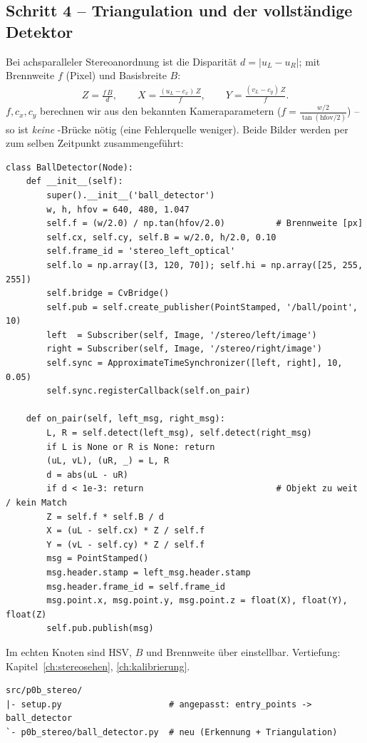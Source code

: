 \subsection{Schritt 4 -- Triangulation und der vollständige Detektor}
Bei achsparalleler Stereoanordnung ist die Disparität $d=|u_L-u_R|$; mit
Brennweite $f$ (Pixel) und Basisbreite $B$:
\begin{align*}
Z=\frac{f\,B}{d},\qquad X=\frac{(u_L-c_x)\,Z}{f},\qquad Y=\frac{(v_L-c_y)\,Z}{f}.
\end{align*}
$f,c_x,c_y$ berechnen wir aus den bekannten Kameraparametern
($f=\tfrac{w/2}{\tan(\text{hfov}/2)}$) -- so ist \emph{keine}
-Brücke nötig (eine Fehlerquelle weniger). Beide Bilder werden
per  zum selben Zeitpunkt zusammengeführt:
\begin{lstlisting}[style=py,caption={\code{p0b\_stereo/ball\_detector.py} (Kern)}]
class BallDetector(Node):
    def __init__(self):
        super().__init__('ball_detector')
        w, h, hfov = 640, 480, 1.047
        self.f = (w/2.0) / np.tan(hfov/2.0)          # Brennweite [px]
        self.cx, self.cy, self.B = w/2.0, h/2.0, 0.10
        self.frame_id = 'stereo_left_optical'
        self.lo = np.array([3, 120, 70]); self.hi = np.array([25, 255, 255])
        self.bridge = CvBridge()
        self.pub = self.create_publisher(PointStamped, '/ball/point', 10)
        left  = Subscriber(self, Image, '/stereo/left/image')
        right = Subscriber(self, Image, '/stereo/right/image')
        self.sync = ApproximateTimeSynchronizer([left, right], 10, 0.05)
        self.sync.registerCallback(self.on_pair)

    def on_pair(self, left_msg, right_msg):
        L, R = self.detect(left_msg), self.detect(right_msg)
        if L is None or R is None: return
        (uL, vL), (uR, _) = L, R
        d = abs(uL - uR)
        if d < 1e-3: return                          # Objekt zu weit / kein Match
        Z = self.f * self.B / d
        X = (uL - self.cx) * Z / self.f
        Y = (vL - self.cy) * Z / self.f
        msg = PointStamped()
        msg.header.stamp = left_msg.header.stamp
        msg.header.frame_id = self.frame_id
        msg.point.x, msg.point.y, msg.point.z = float(X), float(Y), float(Z)
        self.pub.publish(msg)
\end{lstlisting}
\noindent Im echten Knoten sind HSV, $B$ und Brennweite über
 einstellbar. Vertiefung: Kapitel~\ref{ch:stereosehen},
\ref{ch:kalibrierung}.
\begin{lstlisting}[style=bash,caption={\code{ros2\_ws}-Delta nach Schritt 4 (\# neu / \# angepasst)}]
src/p0b_stereo/
|- setup.py                     # angepasst: entry_points -> ball_detector
`- p0b_stereo/ball_detector.py  # neu (Erkennung + Triangulation)
\end{lstlisting}

